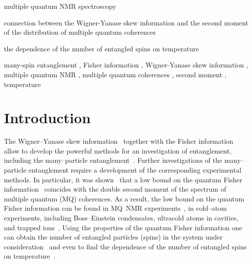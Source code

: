 \documentclass[preprint,12pt]{elsarticle}
\begin{document}
\begin{frontmatter}

\begin{highlights}
	\item multiple quantum NMR spectroscopy
	\item connection between the Wigner-Yanase skew information and the second moment of the distribution of multiple quantum coherences
	\item the dependence of the number of entangled spins on temperature
\end{highlights}

\begin{keyword}
	many-spin entanglement \sep
	Fisher information \sep
	Wigner-Yanase skew information \sep
	multiple quantum NMR \sep
	multiple quantum coherences \sep
	second moment \sep
	temperature
\end{keyword}

\end{frontmatter}

\linenumbers


\section{Introduction}
\label{sec:1}
The Wigner--Yanase skew information~\cite{1,2,3,4} together with the Fisher information~\cite{5,6} allow to develop the powerful methods for an investigation of entanglement, including the many--particle entanglement~\cite{7,8}.
Further investigations of the many--particle entanglement require a development of the corresponding experimental methods.
In particular, it was shown~\cite{7,9} that a low bound on the quantum Fisher information~\cite{5,6} coincides with the double second moment of the spectrum of multiple quantum (MQ) coherences.
As a result, the low bound on the quantum Fisher information can be found in MQ~NMR experiments~\cite{10},
in cold--atom experiments, including Bose--Einstein condensates, ultracold atoms in cavities, and trapped ions~\cite{11,12,13,14,15}.
Using the properties of the quantum Fisher information one can obtain the number of entangled particles (spins) in the system under consideration~\cite{7}
and even to find the dependence of the number of entangled spins on temperature~\cite{9}.
\end{document}
